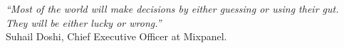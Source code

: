 \cleardoublepage
\thispagestyle{plain}

\vspace*{8cm}

\begin{flushright}
  \textsl{``Most of the world will make decisions by either guessing or using their gut.\\They will be either lucky or wrong.''}\\
\vspace*{1.5cm}
    Suhail Doshi, Chief Executive Officer at Mixpanel.
\end{flushright}



